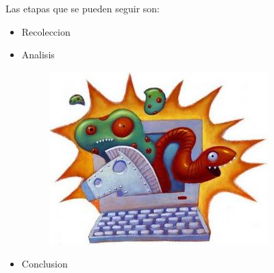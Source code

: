 \documentclass[12pt]{beamer} %
\begin{document}
\begin{slide}
  Las etapas que se pueden seguir son:
  \begin{itemize}
  \item Recoleccion
  \item Analisis

    \begin{figure}[h]
      \begin{center}
        \includegraphics[height=0.3\textheight]{img/malwares1.jpg}
      \end{center}
    \end{figure}

  \item Conclusion
  \end{itemize}
\end{slide}

\end{document}
